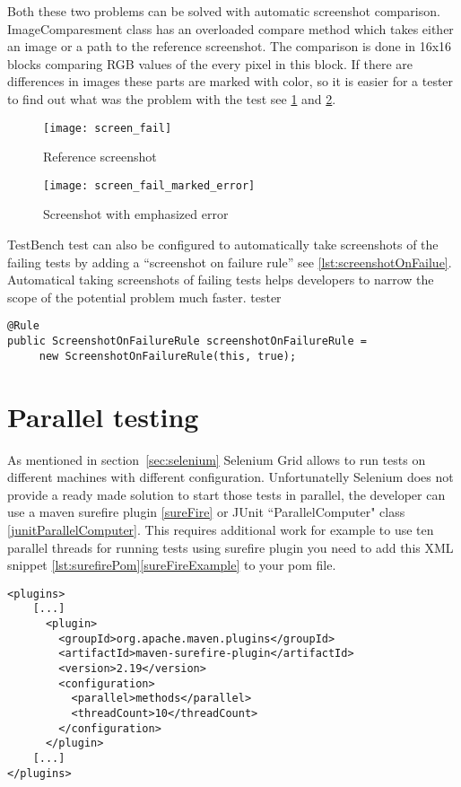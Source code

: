 Both these two problems can be solved with automatic screenshot comparison.
ImageComparesment class has an overloaded compare method which takes either an
image or a path to the reference screenshot. The comparison is done in 16x16
blocks comparing RGB values of the every pixel in this block. If there are
differences in images these parts are marked with color, so it is easier for a
tester to find out what was the problem with the test see
\ref{fig:failedscreen} and \ref{fig:failedscreenmarked}.

	\begin{figure}
	\label{fig:failedscreen}
	\texttt{[image: screen\_fail]}
	\caption{Reference screenshot}
	\end{figure}

	\begin{figure}
	\label{fig:failedscreenmarked}
	\texttt{[image: screen\_fail\_marked\_error]}
	\caption{Screenshot with emphasized error}
	\end{figure}

TestBench test can also be configured to automatically take screenshots of the failing tests by adding
a ``screenshot on failure rule'' see \ref{lst:screenshotOnFailue}. Automatical
taking screenshots of failing tests helps developers to narrow the
scope of the potential problem much faster.
tester
  	\begin{lstlisting}[caption=Adding screenshot on failure	rule,label={lst:screenshotOnFailue}]
@Rule
public ScreenshotOnFailureRule screenshotOnFailureRule =
	 new ScreenshotOnFailureRule(this, true);
	\end{lstlisting}

\section{Parallel testing}
As mentioned in section~\ref{sec:selenium} Selenium Grid allows to run
tests on different machines with different configuration. Unfortunatelly
Selenium does not provide a ready made solution to start those tests in
parallel, the developer can  use a maven surefire plugin \ref{sureFire} 
or JUnit ``ParallelComputer" class \ref{junitParallelComputer}. This requires
additional work for example to use ten parallel threads for running tests using
surefire plugin you need to add this XML snippet \ref{lst:surefirePom}\ref{sureFireExample}
to your pom file.

\lstset{language=XML}
\begin{lstlisting}[caption=Get Vaadin Table cell Value,label={lst:surefirePom}]
<plugins>
    [...]
      <plugin>
        <groupId>org.apache.maven.plugins</groupId>
        <artifactId>maven-surefire-plugin</artifactId>
        <version>2.19</version>
        <configuration>
          <parallel>methods</parallel>
          <threadCount>10</threadCount>
        </configuration>
      </plugin>
    [...]
</plugins>
\end{lstlisting}	

